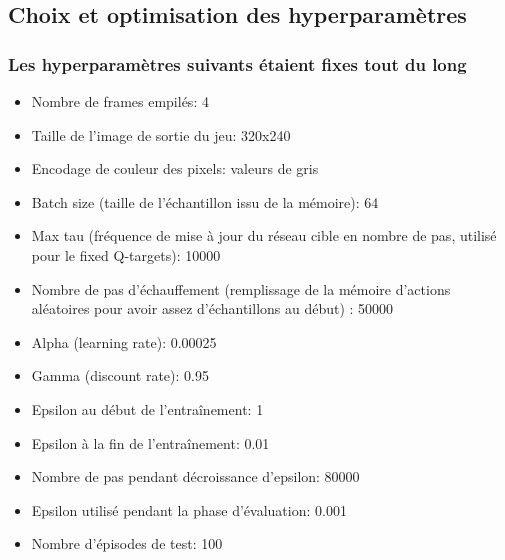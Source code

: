 \documentclass[a4paper,10pt,openany,oneside]{report}
\begin{document}
\subsection{Choix et optimisation des hyperparamètres}
\subsubsection*{Les hyperparamètres suivants étaient fixes tout du long}
\begin{itemize}
\item Nombre de frames empilés: 4
\item Taille de l'image de sortie du jeu: 320x240
\item Encodage de couleur des pixels: valeurs de gris
\item Batch size (taille de l'échantillon issu de la mémoire): 64
\item Max tau (fréquence de mise à jour du réseau cible en nombre de pas, utilisé pour le fixed Q-targets): 10000
\item Nombre de pas d'échauffement (remplissage de la mémoire d'actions aléatoires pour avoir assez d'échantillons au début) : 50000
\item Alpha (learning rate): 0.00025
\item Gamma (discount rate): 0.95
\item Epsilon au début de l'entraînement: 1
\item Epsilon à la fin de l'entraînement: 0.01
\item Nombre de pas pendant décroissance d'epsilon: 80000
\item Epsilon utilisé pendant la phase d'évaluation: 0.001
\item Nombre d'épisodes de test: 100
\end{itemize}
\end{document}
